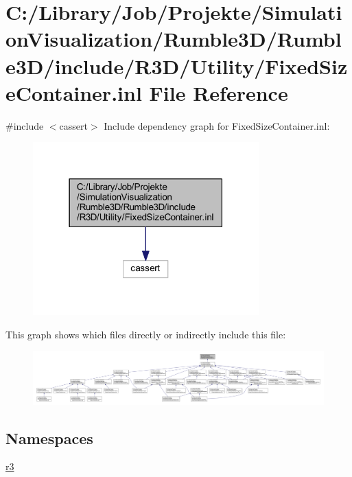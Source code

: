 \hypertarget{_fixed_size_container_8inl}{}\section{C\+:/\+Library/\+Job/\+Projekte/\+Simulation\+Visualization/\+Rumble3\+D/\+Rumble3\+D/include/\+R3\+D/\+Utility/\+Fixed\+Size\+Container.inl File Reference}
\label{_fixed_size_container_8inl}
{\ttfamily \#include $<$cassert$>$}\newline
Include dependency graph for Fixed\+Size\+Container.\+inl\+:\nopagebreak
\begin{figure}[H]
\begin{center}
\leavevmode
\includegraphics[width=247pt]{_fixed_size_container_8inl__incl}
\end{center}
\end{figure}
This graph shows which files directly or indirectly include this file\+:\nopagebreak
\begin{figure}[H]
\begin{center}
\leavevmode
\includegraphics[width=350pt]{_fixed_size_container_8inl__dep__incl}
\end{center}
\end{figure}
\subsection*{Namespaces}
\begin{DoxyCompactItemize}
\item 
 \mbox{\hyperlink{namespacer3}{r3}}
\end{DoxyCompactItemize}
